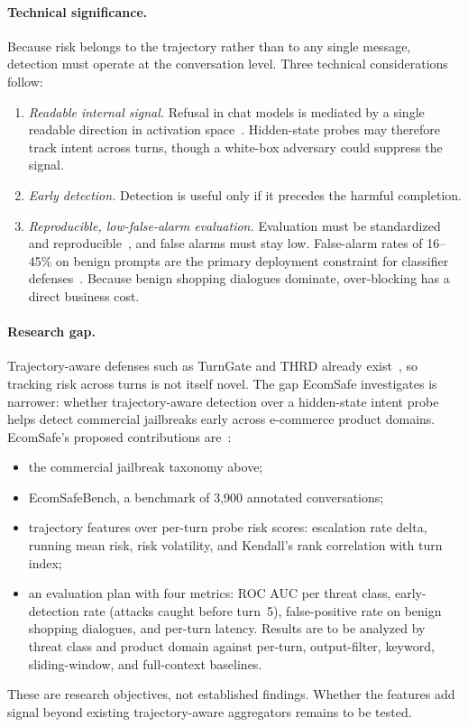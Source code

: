 \documentclass[sigconf]{acmart}
\begin{document}
\paragraph{Technical significance.}
Because risk belongs to the trajectory rather than to any single message, detection must operate at the conversation level. Three technical considerations follow:
\begin{enumerate}
  \item \emph{Readable internal signal.} Refusal in chat models is mediated by a single readable direction in activation space~\cite{arditi2024refusal}. Hidden-state probes may therefore track intent across turns, though a white-box adversary could suppress the signal.
  \item \emph{Early detection.} Detection is useful only if it precedes the harmful completion.
  \item \emph{Reproducible, low-false-alarm evaluation.} Evaluation must be standardized and reproducible~\cite{mazeika2024harmbench,chao2024jailbreakbench}, and false alarms must stay low. False-alarm rates of 16--45\% on benign prompts are the primary deployment constraint for classifier defenses~\cite{sheoran2026multiturnpsb}. Because benign shopping dialogues dominate, over-blocking has a direct business cost.
\end{enumerate}

\paragraph{Research gap.}
Trajectory-aware defenses such as TurnGate and THRD already exist~\cite{guida2026cognitive}, so tracking risk across turns is not itself novel. The gap EcomSafe investigates is narrower: whether trajectory-aware detection over a hidden-state intent probe helps detect commercial jailbreaks early across e-commerce product domains. EcomSafe's proposed contributions are~\cite{koshal2026cart}:
\begin{itemize}
  \item the commercial jailbreak taxonomy above;
  \item EcomSafeBench, a benchmark of 3,900 annotated conversations;
  \item trajectory features over per-turn probe risk scores: escalation rate delta, running mean risk, risk volatility, and Kendall's rank correlation with turn index;
  \item an evaluation plan with four metrics: ROC AUC per threat class, early-detection rate (attacks caught before turn~5), false-positive rate on benign shopping dialogues, and per-turn latency. Results are to be analyzed by threat class and product domain against per-turn, output-filter, keyword, sliding-window, and full-context baselines.
\end{itemize}
These are research objectives, not established findings. Whether the features add signal beyond existing trajectory-aware aggregators remains to be tested.
\end{document}
